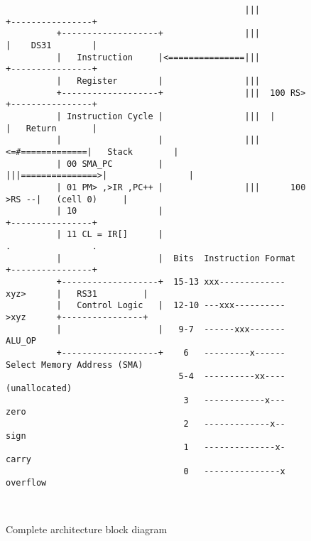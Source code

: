 \begin{figure*}[h!]
\begin{lstlisting}
                                               |||                +----------------+
          +-------------------+                |||                |    DS31        |
          |   Instruction     |<===============|||                +----------------+
          |   Register        |                |||
          +-------------------+                |||  100 RS>       +----------------+
          | Instruction Cycle |                |||  |             |   Return       |
          |                   |                |||<=#=============|   Stack        |
          | 00 SMA_PC         |                |||===============>|                |
          | 01 PM> ,>IR ,PC++ |                |||      100 >RS --|   (cell 0)     |
          | 10                |                                   +----------------+
          | 11 CL = IR[]      |                                   .                .
          |                   |  Bits  Instruction Format         +----------------+
          +-------------------+  15-13 xxx------------- xyz>      |   RS31         |
          |   Control Logic   |  12-10 ---xxx---------- >xyz      +----------------+
          |                   |   9-7  ------xxx------- ALU_OP      
          +-------------------+    6   ---------x------ Select Memory Address (SMA)
                                  5-4  ----------xx---- (unallocated)
                                   3   ------------x--- zero
                                   2   -------------x-- sign
                                   1   --------------x- carry
                                   0   ---------------x overflow
                                 
                                                
\end{lstlisting}
\caption[Architecture Block Diagram]{Complete architecture block diagram}
\end{figure*}



